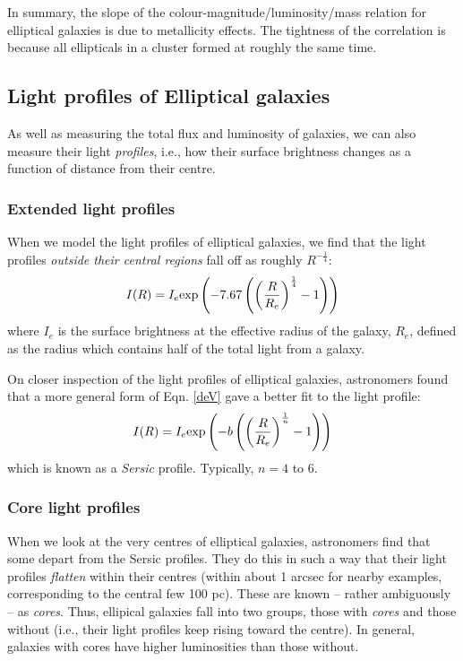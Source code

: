 \documentclass[11pt]{article}
\begin{document}
In summary, the slope of the colour-magnitude/luminosity/mass relation
for elliptical galaxies is due to metallicity effects. The tightness
of the correlation is because all ellipticals in a cluster formed at
roughly the same time.

\subsection{Light profiles of Elliptical galaxies}
As well as measuring the total flux and luminosity of galaxies, we can
also measure their light {\it profiles}, i.e., how their surface
brightness changes as a function of distance from their centre.

\subsubsection{Extended light profiles}
When we model the light profiles of elliptical galaxies, we find that
the light profiles {\it outside their central regions} fall off as
roughly $R^{-\frac{1}{4}}$:
\begin{equation}
\label{deV}
I(R)=I_e{\rm exp}\left(-7.67\left(\left(\frac{R}{R_e}\right)^{\frac{1}{4}}-1\right)\right)
\end{equation}
where $I_e$ is the surface brightness at the effective radius of the
galaxy, $R_e$, defined as the radius which contains half of the total
light from a galaxy.

On closer inspection of the light profiles of elliptical galaxies,
astronomers found that a more general form of Eqn. \ref{deV} gave a
better fit to the light profile:
\begin{equation}
\label{deV}
I(R)=I_e{\rm exp}\left(-b\left(\left(\frac{R}{R_e}\right)^{\frac{1}{n}}-1\right)\right)
\end{equation}
which is known as a {\it Sersic} profile. Typically, $n=4$ to 6.

\subsubsection{Core light profiles}
When we look at the very centres of elliptical galaxies, astronomers
find that some depart from the Sersic profiles. They do this in such a
way that their light profiles {\it flatten} within their centres
(within about 1 arcsec for nearby examples, corresponding to the
central few 100 pc). These are known -- rather ambiguously -- as {\it
  cores}. Thus, ellipical galaxies fall into two groups, those with
{\it cores} and those without (i.e., their light profiles keep rising
toward the centre). In general, galaxies with cores have higher
luminosities than those without.
\end{document}
